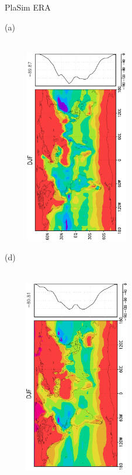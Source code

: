 \documentclass[12pt,a4paper,twoside,openright,headinclude,liststotoc,bibtotoc]{scrreprt}
\begin{document}
\begin{appendix}
\begin{figure}[b]
\hspace{3.1cm}PlaSim \vspace{0.2cm} \hspace{7.1cm} ERA \\
\parbox{8.5cm}{\hspace{0.50cm}\begin{scriptsize} (a)\end{scriptsize} \vspace{-0.5cm} \\
\includegraphics[height=8.5cm,width=6.5cm,angle=-90]
{eps/zonalysmslhflu147DJF.eps}
}
\parbox{8.5cm}{\hspace{0.25cm}\begin{scriptsize} (d)\end{scriptsize} \vspace{-0.5cm} \\
\includegraphics[height=8.5cm,width=6.5cm,angle=-90]
{eps/zonalt21ysmslhfl147DJFfinal.eps}
}
\end{figure}
\end{appendix}
\end{document}
